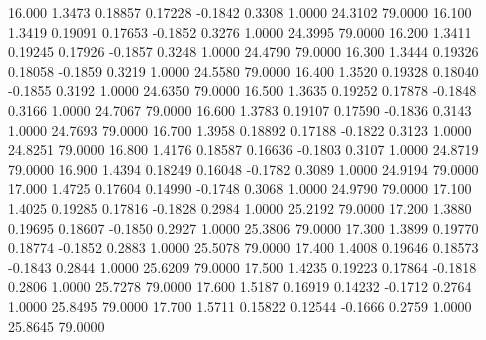   16.000   1.3473   0.18857   0.17228  -0.1842   0.3308   1.0000  24.3102  79.0000
  16.100   1.3419   0.19091   0.17653  -0.1852   0.3276   1.0000  24.3995  79.0000
  16.200   1.3411   0.19245   0.17926  -0.1857   0.3248   1.0000  24.4790  79.0000
  16.300   1.3444   0.19326   0.18058  -0.1859   0.3219   1.0000  24.5580  79.0000
  16.400   1.3520   0.19328   0.18040  -0.1855   0.3192   1.0000  24.6350  79.0000
  16.500   1.3635   0.19252   0.17878  -0.1848   0.3166   1.0000  24.7067  79.0000
  16.600   1.3783   0.19107   0.17590  -0.1836   0.3143   1.0000  24.7693  79.0000
  16.700   1.3958   0.18892   0.17188  -0.1822   0.3123   1.0000  24.8251  79.0000
  16.800   1.4176   0.18587   0.16636  -0.1803   0.3107   1.0000  24.8719  79.0000
  16.900   1.4394   0.18249   0.16048  -0.1782   0.3089   1.0000  24.9194  79.0000
  17.000   1.4725   0.17604   0.14990  -0.1748   0.3068   1.0000  24.9790  79.0000
  17.100   1.4025   0.19285   0.17816  -0.1828   0.2984   1.0000  25.2192  79.0000
  17.200   1.3880   0.19695   0.18607  -0.1850   0.2927   1.0000  25.3806  79.0000
  17.300   1.3899   0.19770   0.18774  -0.1852   0.2883   1.0000  25.5078  79.0000
  17.400   1.4008   0.19646   0.18573  -0.1843   0.2844   1.0000  25.6209  79.0000
  17.500   1.4235   0.19223   0.17864  -0.1818   0.2806   1.0000  25.7278  79.0000
  17.600   1.5187   0.16919   0.14232  -0.1712   0.2764   1.0000  25.8495  79.0000
  17.700   1.5711   0.15822   0.12544  -0.1666   0.2759   1.0000  25.8645  79.0000
